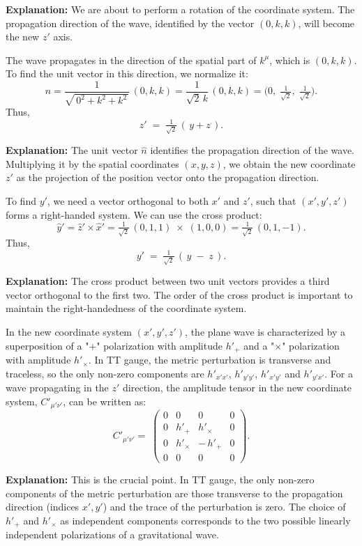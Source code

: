 \documentclass{article}
\begin{document}
\textbf{Explanation:}
We are about to perform a rotation of the coordinate system. The propagation direction of the wave, identified by the vector $(0, k, k)$, will become the new $z'$ axis.

The wave propagates in the direction of the spatial part of $k^{\mu}$, which is $(0, k, k)$. To find the unit vector in this direction, we normalize it:
\[
\hat{n}
= \frac{1}{\sqrt{\,0^2 + k^2 + k^2\,}}\, (0, k, k)
= \frac{1}{\sqrt{2}\,k}\,(0, k, k)
= \biggl(0,\;\tfrac{1}{\sqrt{2}},\;\tfrac{1}{\sqrt{2}}\biggr).
\]
Thus,
\[
z' \;=\; \tfrac{1}{\sqrt{2}}\,(\,y + z\,).
\]

\textbf{Explanation:}
The unit vector $\hat{n}$ identifies the propagation direction of the wave. Multiplying it by the spatial coordinates $(x, y, z)$, we obtain the new coordinate $z'$ as the projection of the position vector onto the propagation direction.

To find $y'$, we need a vector orthogonal to both $x'$ and $z'$, such that $(x', y', z')$ forms a right-handed system. We can use the cross product:
\[
\hat{y}'
= \hat{z}' \times \hat{x}'
= \tfrac{1}{\sqrt{2}}\,(0, 1, 1)
\;\times\; (1, 0, 0)
= \tfrac{1}{\sqrt{2}}\,(0, 1, -1).
\]
Thus,
\[
y' \;=\; \tfrac{1}{\sqrt{2}}\,(\,y \;-\; z\,).
\]

\textbf{Explanation:}
The cross product between two unit vectors provides a third vector orthogonal to the first two. The order of the cross product is important to maintain the right-handedness of the coordinate system.

In the new coordinate system $(x', y', z')$, the plane wave is characterized by a superposition of a "+" polarization with amplitude $h'_{+}$ and a "$\times$" polarization with amplitude $h'_{\times}$. In TT gauge, the metric perturbation is transverse and traceless, so the only non-zero components are $h'_{x'x'}$, $h'_{y'y'}$, $h'_{x'y'}$ and $h'_{y'x'}$. For a wave propagating in the $z'$ direction, the amplitude tensor in the new coordinate system, $C'_{\mu'\nu'}$, can be written as:
\[
C'_{\mu'\nu'}
=\;
\begin{pmatrix}
0 & 0 & 0 & 0\\
0 & h'_{+} & h'_{\times} & 0\\
0 & h'_{\times} & -\,h'_{+} & 0\\
0 & 0 & 0 & 0
\end{pmatrix}.
\]

\textbf{Explanation:}
This is the crucial point. In TT gauge, the only non-zero components of the metric perturbation are those transverse to the propagation direction (indices $x',y'$) and the trace of the perturbation is zero. The choice of $h'_{+}$ and $h'_{\times}$ as independent components corresponds to the two possible linearly independent polarizations of a gravitational wave.
\end{document}
